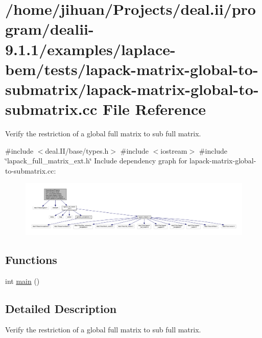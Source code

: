 \hypertarget{lapack-matrix-global-to-submatrix_8cc}{}\section{/home/jihuan/\+Projects/deal.ii/program/dealii-\/9.1.1/examples/laplace-\/bem/tests/lapack-\/matrix-\/global-\/to-\/submatrix/lapack-\/matrix-\/global-\/to-\/submatrix.cc File Reference}
\label{lapack-matrix-global-to-submatrix_8cc}


Verify the restriction of a global full matrix to sub full matrix.  


{\ttfamily \#include $<$deal.\+I\+I/base/types.\+h$>$}\newline
{\ttfamily \#include $<$iostream$>$}\newline
{\ttfamily \#include \char`\"{}lapack\+\_\+full\+\_\+matrix\+\_\+ext.\+h\char`\"{}}\newline
Include dependency graph for lapack-\/matrix-\/global-\/to-\/submatrix.cc\+:\nopagebreak
\begin{figure}[H]
\begin{center}
\leavevmode
\includegraphics[width=350pt]{lapack-matrix-global-to-submatrix_8cc__incl}
\end{center}
\end{figure}
\subsection*{Functions}
\begin{DoxyCompactItemize}
\item 
int \hyperlink{lapack-matrix-global-to-submatrix_8cc_ae66f6b31b5ad750f1fe042a706a4e3d4}{main} ()
\end{DoxyCompactItemize}


\subsection{Detailed Description}
Verify the restriction of a global full matrix to sub full matrix. 

